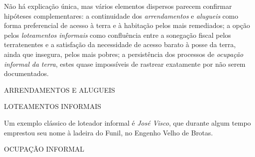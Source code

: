Não há explicação única, mas vários elementos dispersos parecem confirmar hipóteses complementares: a continuidade dos \textit{arrendamentos} e \textit{alugueis} como forma preferencial de acesso à terra e à habitação pelos mais remediados; a opção pelos \textit{loteamentos informais} como confluência entre a sonegação fiscal pelos terratenentes e a satisfação da necessidade de acesso barato à posse da terra, ainda que insegura, pelos mais pobres; a persistência dos processos de \textit{ocupação informal da terra}, estes quase impossíveis de rastrear exatamente por não serem documentados.

ARRENDAMENTOS E ALUGUEIS

LOTEAMENTOS INFORMAIS

Um exemplo clássico de loteador informal é \textit{José Visco}, que durante algum tempo emprestou seu nome à ladeira do Funil, no Engenho Velho de Brotas. 

OCUPAÇÃO INFORMAL


